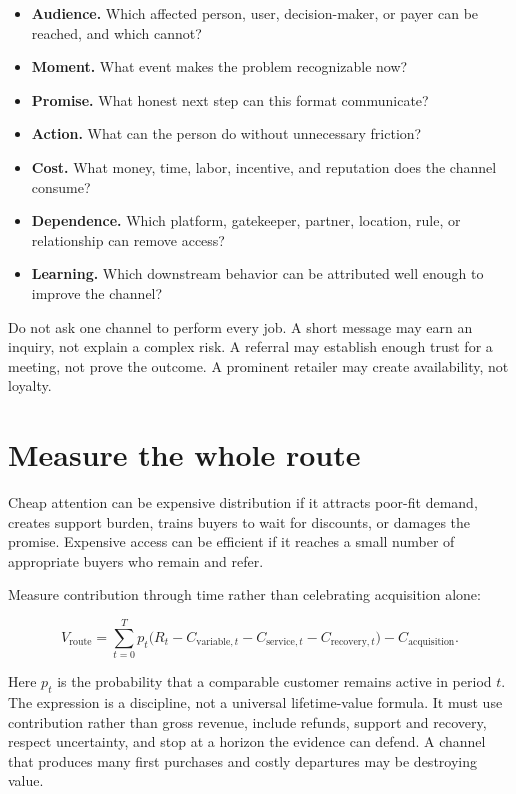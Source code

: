 \begin{itemize}[leftmargin=1.5em,itemsep=0.15em]
\item \textbf{Audience.} Which affected person, user, decision-maker, or payer
  can be reached, and which cannot?
\item \textbf{Moment.} What event makes the problem recognizable now?
\item \textbf{Promise.} What honest next step can this format communicate?
\item \textbf{Action.} What can the person do without unnecessary friction?
\item \textbf{Cost.} What money, time, labor, incentive, and reputation does the
  channel consume?
\item \textbf{Dependence.} Which platform, gatekeeper, partner, location, rule,
  or relationship can remove access?
\item \textbf{Learning.} Which downstream behavior can be attributed well
  enough to improve the channel?
\end{itemize}

Do not ask one channel to perform every job. A short message may earn an
inquiry, not explain a complex risk. A referral may establish enough trust for
a meeting, not prove the outcome. A prominent retailer may create availability,
not loyalty.

\section{Measure the whole route}

Cheap attention can be expensive distribution if it attracts poor-fit demand,
creates support burden, trains buyers to wait for discounts, or damages the
promise. Expensive access can be efficient if it reaches a small number of
appropriate buyers who remain and refer.

Measure contribution through time rather than celebrating acquisition alone:

\begin{equation}
V_{\mathrm{route}}
=\sum_{t=0}^{T} p_t
  \bigl(R_t-C_{\mathrm{variable},t}-C_{\mathrm{service},t}
  -C_{\mathrm{recovery},t}\bigr)
  -C_{\mathrm{acquisition}}.
\end{equation}

Here \(p_t\) is the probability that a comparable customer remains active in
period \(t\). The expression is a discipline, not a universal lifetime-value
formula. It must use contribution rather than gross revenue, include refunds,
support and recovery, respect uncertainty, and stop at a horizon the evidence
can defend. A channel that produces many first purchases and costly departures
may be destroying value.

